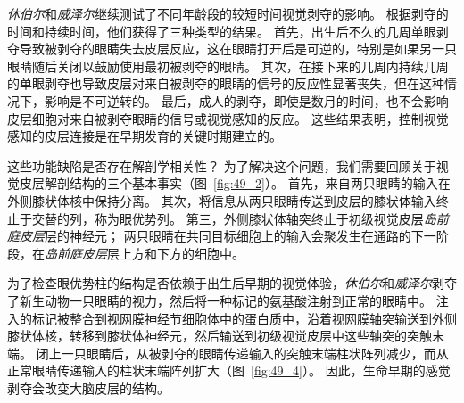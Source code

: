 \textit{休伯尔}和\textit{威泽尔}继续测试了不同年龄段的较短时间视觉剥夺的影响。
根据剥夺的时间和持续时间，他们获得了三种类型的结果。
首先，出生后不久的几周单眼剥夺导致被剥夺的眼睛失去皮层反应，这在眼睛打开后是可逆的，特别是如果另一只眼睛随后关闭以鼓励使用最初被剥夺的眼睛。
其次，在接下来的几周内持续几周的单眼剥夺也导致皮层对来自被剥夺的眼睛的信号的反应性显著丧失，但在这种情况下，影响是不可逆转的。
最后，成人的剥夺，即使是数月的时间，也不会影响皮层细胞对来自被剥夺眼睛的信号或视觉感知的反应。
这些结果表明，控制视觉感知的皮层连接是在早期发育的关键时期建立的。


这些功能缺陷是否存在解剖学相关性？
为了解决这个问题，我们需要回顾关于视觉皮层解剖结构的三个基本事实（图~\ref{fig:49_2}）。
首先，来自两只眼睛的输入在外侧膝状体核中保持分离。
其次，将信息从两只眼睛传送到皮层的膝状体输入终止于交替的列，称为眼优势列。
第三，外侧膝状体轴突终止于初级视觉皮层\textit{岛前庭皮层}层的神经元；
两只眼睛在共同目标细胞上的输入会聚发生在通路的下一阶段，在\textit{岛前庭皮层}层上方和下方的细胞中。


为了检查眼优势柱的结构是否依赖于出生后早期的视觉体验，\textit{休伯尔}和\textit{威泽尔}剥夺了新生动物一只眼睛的视力，然后将一种标记的氨基酸注射到正常的眼睛中。
注入的标记被整合到视网膜神经节细胞体中的蛋白质中，沿着视网膜轴突输送到外侧膝状体核，转移到膝状体神经元，然后输送到初级视觉皮层中这些轴突的突触末端。
闭上一只眼睛后，从被剥夺的眼睛传递输入的突触末端柱状阵列减少，而从正常眼睛传递输入的柱状末端阵列扩大（图~\ref{fig:49_4}）。
因此，生命早期的感觉剥夺会改变大脑皮层的结构。


